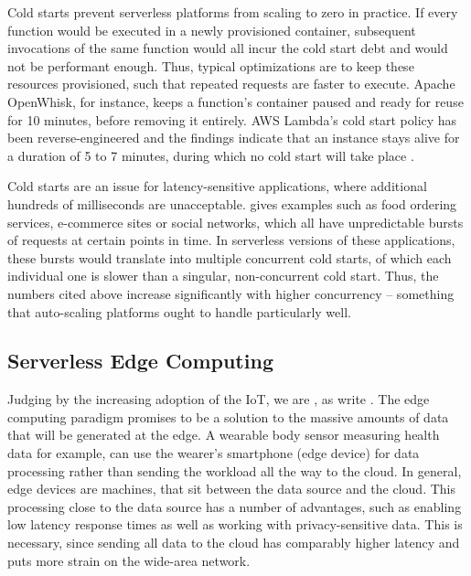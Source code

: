 Cold starts prevent serverless platforms from scaling to zero in practice. If every function would be executed in a newly provisioned container, subsequent invocations of the same function would all incur the cold start debt and would not be performant enough. Thus, typical optimizations are to keep these resources provisioned, such that repeated requests are faster to execute. Apache OpenWhisk, for instance, keeps a function's container paused and ready for reuse for 10 minutes, before removing it entirely. AWS Lambda's cold start policy has been reverse-engineered and the findings indicate that an instance stays alive for a duration of 5 to 7 minutes, during which no cold start will take place \cite{ShilCold2021}.

Cold starts are an issue for latency-sensitive applications, where additional hundreds of milliseconds are unacceptable. \citeauthor{Cui2018} gives examples such as food ordering services, e-commerce sites or social networks, which all have unpredictable bursts of requests at certain points in time. In serverless versions of these applications, these bursts would translate into multiple concurrent cold starts, of which each individual one is slower than a singular, non-concurrent cold start. Thus, the numbers cited above increase significantly with higher concurrency \cite{Mohan2019, Cui2018} -- something that auto-scaling platforms ought to handle particularly well.

\subsection{Serverless Edge Computing}


Judging by the increasing adoption of the IoT, we are , as \citeauthor{Shi2016} write \cite{Shi2016}. The edge computing paradigm promises to be a solution to the massive amounts of data that will be generated at the edge. A wearable body sensor measuring health data for example, can use the wearer's smartphone (edge device) for data processing rather than sending the workload all the way to the cloud. In general, edge devices are machines, that sit between the data source and the cloud. This processing close to the data source has a number of advantages, such as enabling low latency response times as well as working with privacy-sensitive data. This is necessary, since sending all data to the cloud has comparably higher latency and puts more strain on the wide-area network.

